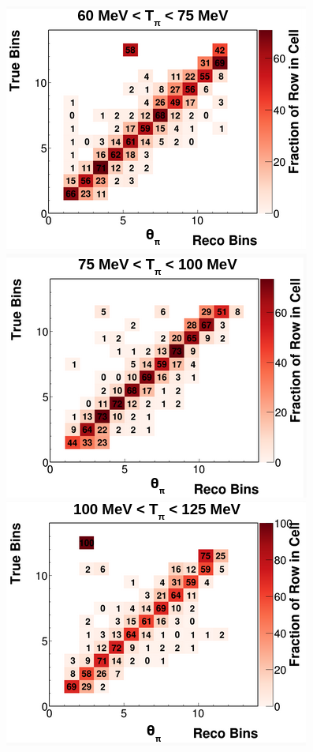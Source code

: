 \begin{figure}[!htb]
    \includegraphics[scale=0.33]{Figures/Chapter4/SignalDefinition/thetapi60to75tpi.png}
    \includegraphics[scale=0.33]{Figures/Chapter4/SignalDefinition/thetapi75to100tpi.png}
    \includegraphics[scale=0.33]{Figures/Chapter4/SignalDefinition/thetapi100to125tpi.png}

\end{figure}
